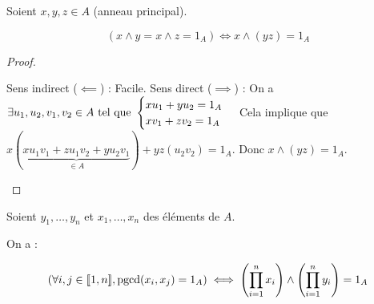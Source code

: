 \documentclass[12pt, a4paper]{report}
\begin{document}
\begin{property}
    Soient $x,y,z \in A$ (anneau principal).

    $$(x\wedge y = x \wedge z= 1_A) \iff x\wedge (yz) = 1_A$$
\end{property}

\begin{proof}
    \begin{outline}
        \1 Sens indirect ($\impliedby$) : Facile.
        \1 Sens direct ($\implies$) : On a $\exists u_1,u_2,v_1,v_2 \in A \text{ tel que } \begin{cases}xu_1 + y u_2 = 1_A\\xv_1 + z v_2 = 1_A\end{cases}$
        \2 Cela implique que $x(\underbrace{xu_1v_1+zu_1v_2+yu_2v_1}_{\in A}) + yz(u_2v_2) = 1_A$.
        \2 Donc $x \wedge (yz) = 1_A$.
    \end{outline}
\end{proof}

\begin{consequence}
    \label{consequence:pgcd_produit}
    Soient $y_1,\dots,y_n$ et $x_1,\dots,x_n$ des éléments de $A$.

    On a :

    $$\left(\forall i,j \in [\![1,n]\!], \mathrm{pgcd}(x_i,x_j)=1_A\right) \iff \left(\prod_{i=1}^n x_i\right)\wedge \left(\prod_{i=1}^n y_i\right) = 1_A$$
\end{consequence}
\end{document}
